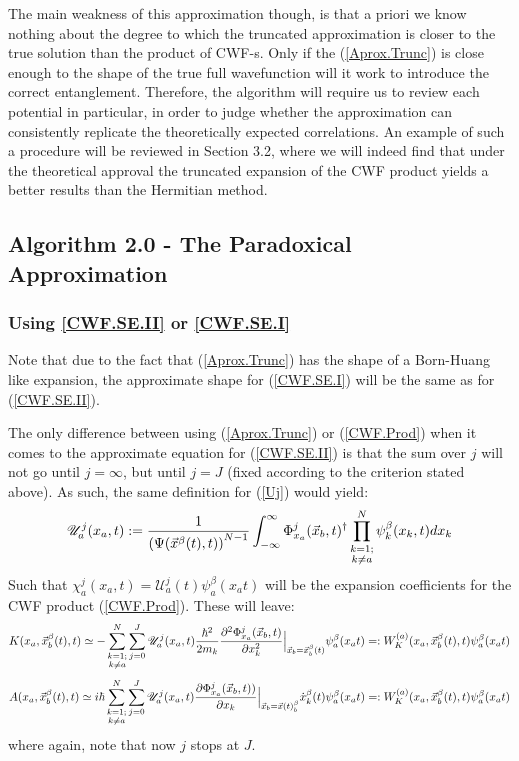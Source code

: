 \documentclass[11pt, a4paper]{article} %
\newcommand{\U}{\mathscr{U}}
\begin{document}
The main weakness of this approximation though, is that a priori we know nothing about the degree to which the truncated approximation is closer to the true solution than the product of CWF-s. Only if the (\ref{Aprox.Trunc}) is close enough to the shape of the true full wavefunction will it work to introduce the correct entanglement. Therefore, the algorithm will require us to review each potential in particular, in order to judge whether the approximation can consistently replicate the theoretically expected correlations. An example of such a procedure will be reviewed in Section 3.2, where we will indeed find that under the theoretical approval the truncated expansion of the CWF product yields a better results than the Hermitian method.\vspace{-0.3cm}

\subsection{Algorithm 2.0 - The Paradoxical Approximation }
\subsubsection{Using \ref{CWF.SE.II} or \ref{CWF.SE.I}}
Note that due to the fact that (\ref{Aprox.Trunc}) has the shape of a Born-Huang like expansion, the approximate shape for (\ref{CWF.SE.I}) will be the same as for (\ref{CWF.SE.II}).

The only difference between using (\ref{Aprox.Trunc}) or (\ref{CWF.Prod}) when it comes to the approximate equation for (\ref{CWF.SE.II}) is that the sum over $j$ will not go until $j=\infty$, but until $j=J$ (fixed according to the criterion stated above). As such, the same definition for (\ref{Uj}) would yield:\vspace{-0.1cm}
$$
\U^j_a(x_a, t):=\frac{1}{ \qty(\Psi(\vec{x}^\beta(t),t))^{N-1}} \int_{-\infty}^\infty \Phi_{x_a}^j(\vec{x}_b,t)^\dagger \prod_{\substack{k=1; \\ k\neq a}}^{N} \psi^\beta_k(x_k,t) dx_k \vspace{-0.1cm}
$$
Such that $\chi_a^j(x_a,t)= \U^j_a(t)\psi_a^\beta(x_a t)$ will be the expansion coefficients for the CWF product (\ref{CWF.Prod}). These will leave:
$$
K(x_a, \vec{x}_b^\beta(t), t) \simeq - \sum_{\substack{k=1; \\ k\neq a}}^{N} \sum_{j=0}^J \U^j_a(x_a,t) \frac{\hbar^2}{2m_k} \pdv[2]{ \Phi_{x_a}^j(\vec{x}_b,t)}{x_k}\Big\rvert_{\vec{x}_b=\vec{x}_b^\beta(t)}\psi_a^\beta(x_a t)=:W_K^{(a)}(x_a, \vec{x}_b^\beta (t),t)\psi_a^\beta(x_a t)
$$
$$
A(x_a, \vec{x}_b^\beta(t), t) \simeq i \hbar \sum_{\substack{k=1; \\ k\neq a}}^{N} \sum_{j=0}^J \U^j_a(x_a,t) \pdv{ \Phi_{x_a}^j(\vec{x}_b,t))}{x_k}\Big\rvert_{\vec{x}_b=\vec{x}(t)_b^\beta} \dot{x}_k^\beta(t)\psi_a^\beta(x_a t)=:W_K^{(a)}(x_a, \vec{x}_b^\beta (t),t)\psi_a^\beta(x_a t)
$$
where again, note that now $j$ stops at $J$. 
\end{document}
